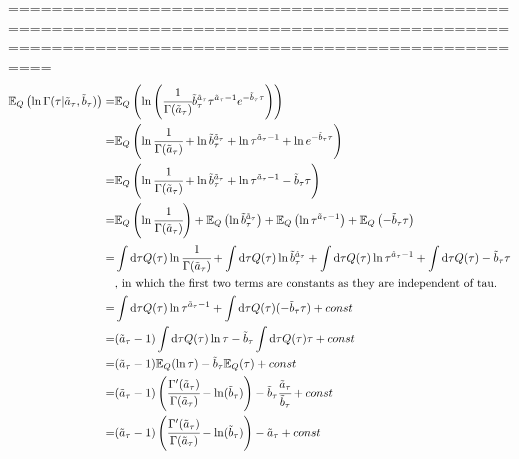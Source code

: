 \documentclass[11pt,notitlepage]{article}
\begin{document}
==============================================================================================================================================
\begin{align*}
\mathbb{E}_Q \left( \ln \Gamma (\tau | \tilde{a}_{\tau}, \tilde{b}_{\tau})\right) =
&\mathbb{E}_Q \left( \ln \left( \cfrac{1}{\Gamma(\tilde{a}_{\tau})} \tilde{b}_{\tau}^{\tilde{a}_{\tau}} \tau^{\tilde{a}_{\tau} -1 } e^{-\tilde{b}_{\tau} \tau} \right) \right)\\
=&\mathbb{E}_Q \left( \ln \cfrac{1}{\Gamma(\tilde{a}_{\tau})} + \ln \tilde{b}_{\tau}^{\tilde{a}_{\tau}}+\ln \tau^{\tilde{a}_{\tau} -1 } + \ln e^{-\tilde{b}_{\tau} \tau} \right)\\
=&\mathbb{E}_Q \left( \ln \cfrac{1}{\Gamma(\tilde{a}_{\tau})} + \ln \tilde{b}_{\tau}^{\tilde{a}_{\tau}}+\ln \tau^{\tilde{a}_{\tau} -1 } -\tilde{b}_{\tau} \tau \right)\\
=& \mathbb{E}_Q \left( \ln \cfrac{1}{\Gamma(\tilde{a}_{\tau})} \right) + \mathbb{E}_Q \left( \ln \tilde{b}_{\tau}^{\tilde{a}_{\tau}} \right) + \mathbb{E}_Q \left( \ln \tau^{\tilde{a}_{\tau} -1 } \right) + \mathbb{E}_Q \left( -\tilde{b}_{\tau} \tau \right)\\
=&\int \mathrm{d}\tau Q(\tau)\ln \cfrac{1}{\Gamma(\tilde{a}_{\tau})}  + \int \mathrm{d}\tau Q(\tau)\ln \tilde{b}_{\tau}^{\tilde{a}_{\tau}}  + \int \mathrm{d}\tau Q(\tau) \ln \tau^{\tilde{a}_{\tau} -1 } + \int \mathrm{d}\tau  Q(\tau) -\tilde{b}_{\tau} \tau\\
&\text{, in which the first two terms are constants as they are independent of tau.}\\
=& \int \mathrm{d}\tau Q(\tau) \ln \tau^{\tilde{a}_{\tau} -1 } + \int \mathrm{d}\tau  Q(\tau) (-\tilde{b}_{\tau} \tau) + const\\
=& (\tilde{a}_{\tau} -1) \int \mathrm{d}\tau Q(\tau) \ln \tau - \tilde{b}_{\tau}\int \mathrm{d}\tau  Q(\tau) \tau+ const\\
=&(\tilde{a}_{\tau} -1) \mathbb{E}_Q(\ln \tau) - \tilde{b}_{\tau} \mathbb{E}_Q(\tau)+ const\\
=&(\tilde{a}_{\tau} -1)\left( \cfrac{\Gamma'(\tilde{a}_{\tau})}{\Gamma(\tilde{a}_{\tau})} - \ln(\tilde{b}_{\tau}) \right) - \tilde{b}_{\tau} \cfrac{\tilde{a}_{\tau}}{\tilde{b}_{\tau}}+ const\\
=&(\tilde{a}_{\tau} -1)\left( \cfrac{\Gamma'(\tilde{a}_{\tau})}{\Gamma(\tilde{a}_{\tau})} - \ln(\tilde{b}_{\tau}) \right) - \tilde{a}_{\tau}+ const
\end{align*}
\end{document}
